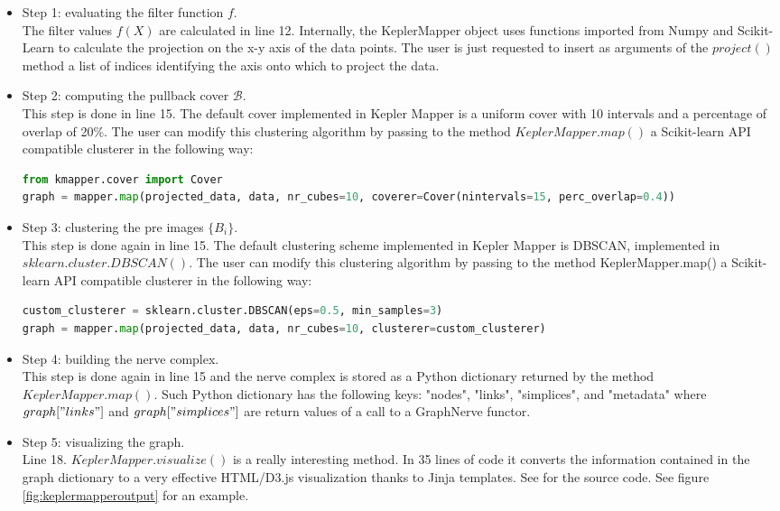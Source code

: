 \begin{itemize}
	\item Step 1: evaluating the filter function $f$. \\The filter values $f(X)$ are calculated in line 12. Internally, the KeplerMapper object uses functions imported from Numpy and Scikit-Learn to calculate the projection on the x-y axis of the data points. The user is just requested to insert as arguments of the $project()$ method a list of indices identifying the axis onto which to project the data.
	\item Step 2: computing the pullback cover $\mathcal B$. \\This step is done in line 15. The default cover implemented in Kepler Mapper is a uniform cover with 10 intervals and a percentage of overlap of 20\%. The user can modify this clustering algorithm by passing to the method $KeplerMapper.map()$ a Scikit-learn API compatible clusterer in the following way:
	\begin{lstlisting}[language=Python]
from kmapper.cover import Cover
graph = mapper.map(projected_data, data, nr_cubes=10, coverer=Cover(nintervals=15, perc_overlap=0.4))\end{lstlisting}
	\item Step 3: clustering the pre images $\{B_i\}$.\\This step is done again in line 15. The default clustering scheme implemented in Kepler Mapper is DBSCAN, implemented in $sklearn.cluster.DBSCAN()$. The user can modify this clustering algorithm by passing to the method KeplerMapper.map() a Scikit-learn API compatible clusterer in the following way:
	\begin{lstlisting}[language=Python]
custom_clusterer = sklearn.cluster.DBSCAN(eps=0.5, min_samples=3)
graph = mapper.map(projected_data, data, nr_cubes=10, clusterer=custom_clusterer)\end{lstlisting}
	\item Step 4: building the nerve complex. \\This step is done again in line 15 and the nerve complex is stored as a Python dictionary returned by the method $KeplerMapper.map()$. Such Python dictionary has the following keys: "nodes", "links", "simplices", and "metadata" where $graph["links"]$ and $graph["simplices"]$ are return values of a call to a GraphNerve functor.
	\item Step 5: visualizing the graph.\\Line 18. $KeplerMapper.visualize()$ is a really interesting method. In 35 lines of code it converts the information contained in the graph dictionary to a very effective HTML/D3.js visualization thanks to Jinja templates. See \cite{KMapper} for the source code. See figure \ref{fig:keplermapperoutput} for an example.
\end{itemize}
